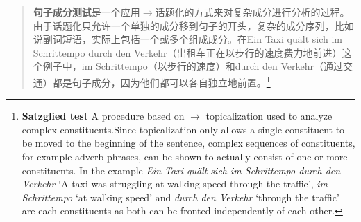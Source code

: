 \begin{quotation}
\textbf{句子成分测试}是一个应用$\to$话题化的方式来对复杂成分进行分析的过程。由于话题化只允许一个单独的成分移到句子的开头，复杂的成分序列，比如说副词短语，实际上包括一个或多个组成成分。在Ein Taxi quält sich im Schrittempo durch den Verkehr（出租车正在以步行的速度费力地前进）这个例子中，im Schrittempo（以步行的速度）和durch den Verkehr（通过交通）都是句子成分，因为他们都可以各自独立地前置。\citep[]{Bussmann83a}\footnote{%
\textbf{Satzglied test} A procedure based on $\to$ topicalization used to analyze complex constituents.Since topicalization only allows a single constituent to be moved to the beginning of the sentence, complex sequences of constituents, for example adverb phrases, can be shown to actually consist of one or more constituents. In the example \textit{Ein Taxi quält sich im Schrittempo durch den Verkehr} `A taxi was struggling at walking speed through the traffic', \textit{im Schrittempo} `at walking speed' and \textit{durch den Verkehr} `through the traffic' are each constituents as both can be fronted independently of each other.}
\end{quotation}


